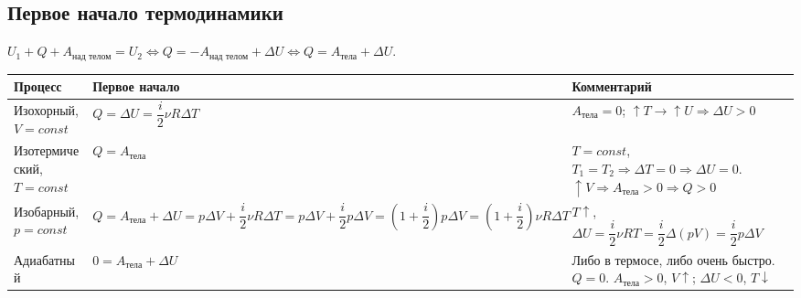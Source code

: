 \documentclass[12pt]{article}
\begin{document}
	\subsection{Первое начало термодинамики}
	$U_1 + Q + A_{\text{над телом}} = U_2 \Leftrightarrow Q = -A_{\text{над телом}} + \varDelta U \Leftrightarrow Q = A_{\text{тела}} + \varDelta U$.
	\begin{xltabular}{\textwidth}{|X|X|X|}
		\hline
		Процесс & Первое начало & Комментарий\\
		\hline
		Изохорный, $V = const$ & $Q = \varDelta U = \dfrac{i}{2} \nu R \varDelta T$ & $A_{\text{тела}} = 0$; $\uparrow T \rightarrow \uparrow U \Rightarrow \varDelta U > 0$\\
		\hline
		Изотермический, $T = const$ & $Q = A_{\text{тела}}$ & $T = const$, $T_1 = T_2 \Rightarrow \varDelta T = 0 \Rightarrow \varDelta U = 0$. $\uparrow V \Rightarrow A_{\text{тела}} > 0 \Rightarrow Q > 0$\\
		\hline
		Изобарный, $p = const$ & $Q = A_{\text{тела}} + \varDelta U = p \varDelta V + \dfrac{i}{2} \nu R \varDelta T = p \varDelta V + \dfrac{i}{2} p \varDelta V = (1 + \dfrac{i}{2})p \varDelta V = (1 + \dfrac{i}{2}) \nu R \varDelta T$ & $T \uparrow$, $\varDelta U = \dfrac{i}{2} \nu RT = \dfrac{i}{2} \varDelta (pV) = \dfrac{i}{2} p \varDelta V$\\
		\hline
		Адиабатный & $0 = A_{\text{тела}} + \varDelta U$ & Либо в термосе, либо очень быстро. $Q = 0$. $A_{\text{тела}} > 0$, $V \uparrow$; $\varDelta U < 0$, $T \downarrow$\\
		\hline
	\end{xltabular}
\end{document}
